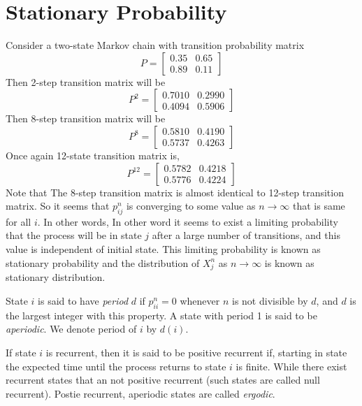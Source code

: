 \chapter{Stationary Probability}
Consider a two-state Markov chain with transition probability matrix 
\[
    P=
    \begin{bmatrix} 
        0.35 & 0.65\\ 
        0.89 & 0.11
    \end{bmatrix} 
\]
Then 2-step transition matrix will be 
\[
    P^{2} = 
    \begin{bmatrix}
        0.7010  &  0.2990 \\ 
        0.4094  &  0.5906 
    \end{bmatrix} 
\]
Then 8-step transition matrix will be
\[
    P^{8} = 
    \begin{bmatrix}
        0.5810  &  0.4190\\ 
        0.5737  &  0.4263 
    \end{bmatrix} 
\]
Once again 12-state transition matrix is,
\[
    P^{12} = 
    \begin{bmatrix}        
        0.5782  &  0.4218\\ 
        0.5776  &  0.4224
    \end{bmatrix} 
\]
Note that The 8-step transition matrix is almost identical to 12-step transition matrix. So it seems that  $ p^{n}_{ij} $ is converging to some
value as $ n\to \infty $ that is same for all $ i $. In other words, In other word it seems to exist a limiting probability that the process will be 
in state  $ j $ after a large number of transitions, and this value is independent of initial state. This limiting probability is known as 
stationary probability and the distribution  of $ X_{j}^{n} $ as $ n\to \infty $ is known as stationary distribution.

State $ i $ is said to have  \textit{period} $ d $ if $ p^{n}_{ii} = 0 $ whenever $ n $ is not divisible by  $ d $, and  $ d $ is the largest
integer with this property. A state with period 1 is said to be \textit{aperiodic}. We denote period of $ i $ by $ d(i) $.

If state $i$ is recurrent, then it is said to be positive recurrent if, starting in state the expected time until the process returns to state $i$ 
is finite. While there exist recurrent states that an not positive recurrent (such states are
called null recurrent). Postie recurrent, aperiodic states are called \textit{ergodic}.

